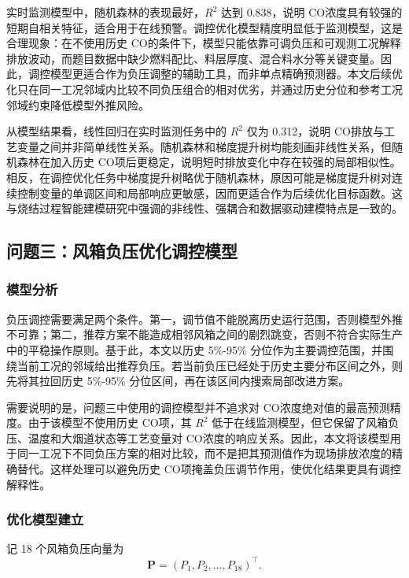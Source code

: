 \documentclass[UTF8,a4paper,zihao=-4]{ctexart}
\newcommand{\CO}{CO}
\begin{document}
实时监测模型中，随机森林的表现最好，$R^2$ 达到 0.838，说明 \CO 浓度具有较强的短期自相关特征，适合用于在线预警。调控优化模型精度明显低于监测模型，这是合理现象：在不使用历史 \CO 的条件下，模型只能依靠可调负压和可观测工况解释排放波动，而题目数据中缺少燃料配比、料层厚度、混合料水分等关键变量。因此，调控模型更适合作为负压调整的辅助工具，而非单点精确预测器。本文后续优化只在同一工况邻域内比较不同负压组合的相对优劣，并通过历史分位和参考工况邻域约束降低模型外推风险。

从模型结果看，线性回归在实时监测任务中的 $R^2$ 仅为 0.312，说明 \CO 排放与工艺变量之间并非简单线性关系。随机森林和梯度提升树均能刻画非线性关系，但随机森林在加入历史 \CO 项后更稳定，说明短时排放变化中存在较强的局部相似性。相反，在调控优化任务中梯度提升树略优于随机森林，原因可能是梯度提升树对连续控制变量的单调区间和局部响应更敏感，因而更适合作为后续优化目标函数。这与烧结过程智能建模研究中强调的非线性、强耦合和数据驱动建模特点是一致的\cite{gong2024deeplearning}。

\subsection{问题三：风箱负压优化调控模型}

\subsubsection{模型分析}

负压调控需要满足两个条件。第一，调节值不能脱离历史运行范围，否则模型外推不可靠；第二，推荐方案不能造成相邻风箱之间的剧烈跳变，否则不符合实际生产中的平稳操作原则。基于此，本文以历史 5\%-95\% 分位作为主要调控范围，并围绕当前工况的邻域给出推荐负压。若当前负压已经处于历史主要分布区间之外，则先将其拉回历史 5\%-95\% 分位区间，再在该区间内搜索局部改进方案。

需要说明的是，问题三中使用的调控模型并不追求对 \CO 浓度绝对值的最高预测精度。由于该模型不使用历史 \CO 项，其 $R^2$ 低于在线监测模型，但它保留了风箱负压、温度和大烟道状态等工艺变量对 \CO 浓度的响应关系。因此，本文将该模型用于同一工况下不同负压方案的相对比较，而不是把其预测值作为现场排放浓度的精确替代。这样处理可以避免历史 \CO 项掩盖负压调节作用，使优化结果更具有调控解释性。

\subsubsection{优化模型建立}

记 18 个风箱负压向量为
\begin{equation}
\mathbf P=(P_1,P_2,\ldots,P_{18})^\top.
\end{equation}
\end{document}
